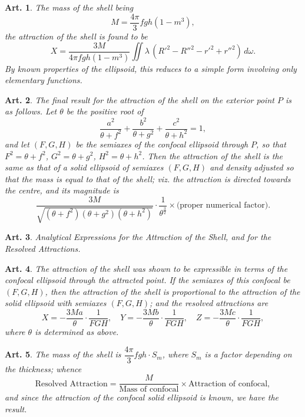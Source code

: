 \documentclass[12pt,a4paper]{article}
\theoremstyle{cayley}
\newtheorem{art}{Art.}[section]
\begin{document}
\begin{art}
The mass of the shell being
\[
M = \frac{4\pi}{3}fgh(1 - m^3),
\]
the attraction of the shell is found to be
\[
X = \frac{3M}{4\pi fgh(1-m^3)} \iint \lambda\,(R'^2 - R''^2 - r'^2 + r''^2)\,d\omega.
\]
By known properties of the ellipsoid, this reduces to a simple form involving only elementary functions.
\end{art}

\begin{art}
The final result for the attraction of the shell on the exterior point $P$ is as follows. Let $\theta$ be the positive root of
\[
\frac{a^2}{\theta + f^2} + \frac{b^2}{\theta + g^2} + \frac{c^2}{\theta + h^2} = 1,
\]
and let $(F, G, H)$ be the semiaxes of the confocal ellipsoid through $P$, so that $F^2 = \theta + f^2$, $G^2 = \theta + g^2$, $H^2 = \theta + h^2$. Then the attraction of the shell is the same as that of a solid ellipsoid of semiaxes $(F, G, H)$ and density adjusted so that the mass is equal to that of the shell; viz. the attraction is directed towards the centre, and its magnitude is
\[
\frac{3M}{\sqrt{(\theta+f^2)(\theta+g^2)(\theta+h^2)}} \cdot \frac{1}{\theta^{\frac{3}{2}}}
\times \text{(proper numerical factor)}.
\]
\end{art}

\begin{art}
Analytical Expressions for the Attraction of the Shell, and for the Resolved Attractions.
\end{art}

\begin{art}
The attraction of the shell was shown to be expressible in terms of the confocal ellipsoid through the attracted point. If the semiaxes of this confocal be $(F, G, H)$, then the attraction of the shell is proportional to the attraction of the solid ellipsoid with semiaxes $(F, G, H)$; and the resolved attractions are
\[
X = -\frac{3Ma}{\theta}\cdot\frac{1}{F G H},\quad
Y = -\frac{3Mb}{\theta}\cdot\frac{1}{F G H},\quad
Z = -\frac{3Mc}{\theta}\cdot\frac{1}{F G H},
\]
where $\theta$ is determined as above.
\end{art}

\begin{art}
The mass of the shell is $\dfrac{4\pi}{3}fgh \cdot S_m$, where $S_m$ is a factor depending on the thickness; whence
\[
\text{Resolved Attraction} = \frac{M}{\text{Mass of confocal}} \times \text{Attraction of confocal},
\]
and since the attraction of the confocal solid ellipsoid is known, we have the result.
\end{art}
\end{document}
